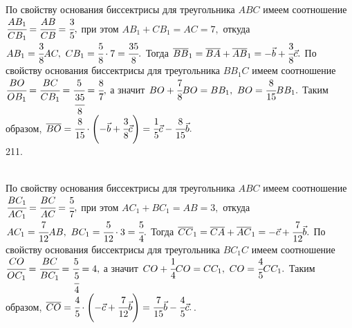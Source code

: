 \documentclass[12pt]{article}
\begin{document}
По свойству основания биссектрисы для треугольника $ABC$ имеем соотношение
$\cfrac{AB_1}{CB_1}=\cfrac{AB}{CB}=\cfrac{3}{5},$ при этом $AB_1+CB_1=AC=7,$ откуда $AB_1=\cfrac{3}{8}AC,\ CB_1=\cfrac{5}{8}\cdot7=\cfrac{35}{8}.$ Тогда $\overline{BB}_1=\overline{BA}+\overline{AB}_1=-\vec{b}+\cfrac{3}{8}\vec{c}.$
По свойству основания биссектрисы для треугольника $BB_1C$ имеем соотношение
$\cfrac{BO}{OB_1}=\cfrac{BC}{CB_1}=\cfrac{5}{\cfrac{35}{8}}=\cfrac{8}{7},$ а значит $BO+\cfrac{7}{8}BO=BB_1,\ BO=\cfrac{8}{15}BB_1.$ Таким образом, $\overline{BO}=\cfrac{8}{15}\cdot\left(-\vec{b}+\cfrac{3}{8}\vec{c}\right)=
\cfrac{1}{5}\vec{c}-\cfrac{8}{15}\vec{b}.$\\
211. \begin{figure}[ht!]
\end{figure}\\
По свойству основания биссектрисы для треугольника $ABC$ имеем соотношение
$\cfrac{BC_1}{AC_1}=\cfrac{BC}{AC}=\cfrac{5}{7},$ при этом $AC_1+BC_1=AB=3,$ откуда $AC_1=\cfrac{7}{12}AB,\ BC_1=\cfrac{5}{12}\cdot3=\cfrac{5}{4}.$ Тогда $\overline{CC}_1=\overline{CA}+\overline{AC}_1=-\vec{c}+\cfrac{7}{12}\vec{b}.$
По свойству основания биссектрисы для треугольника $BC_1C$ имеем соотношение
$\cfrac{CO}{OC_1}=\cfrac{BC}{BC_1}=\cfrac{5}{\cfrac{5}{4}}=4,$ а значит $CO+\cfrac{1}{4}CO=CC_1,\ CO=\cfrac{4}{5}CC_1.$ Таким образом, $\overline{CO}=\cfrac{4}{5}\cdot\left(-\vec{c}+\cfrac{7}{12}\vec{b}\right)=
\cfrac{7}{15}\vec{b}-\cfrac{4}{5}\vec{c}.$\newpage{}. \begin{figure}[ht!]
\end{figure}\\
\end{document}
